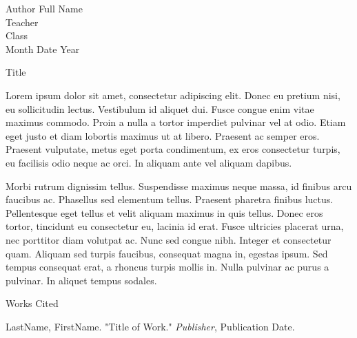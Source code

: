 \documentclass[12pt, letterpaper]{article}
\newcommand{\bibent}{\noindent \hangindent 40pt}
\newenvironment{workscited}{\newpage \begin{center} Works Cited \end{center}}{\newpage }
\begin{document}
\begin{flushleft}

Author Full Name\\
Teacher\\
Class\\
Month Date Year\\

\begin{center}
Title
\end{center}

\setlength{\parindent}{0.5in}

Lorem ipsum dolor sit amet, consectetur adipiscing elit. Donec eu pretium nisi, eu sollicitudin lectus. Vestibulum id aliquet dui. Fusce congue enim vitae maximus commodo. Proin a nulla a tortor imperdiet pulvinar vel at odio. Etiam eget justo et diam lobortis maximus ut at libero. Praesent ac semper eros. Praesent vulputate, metus eget porta condimentum, ex eros consectetur turpis, eu facilisis odio neque ac orci. In aliquam ante vel aliquam dapibus.

Morbi rutrum dignissim tellus. Suspendisse maximus neque massa, id finibus arcu faucibus ac. Phasellus sed elementum tellus. Praesent pharetra finibus luctus. Pellentesque eget tellus et velit aliquam maximus in quis tellus. Donec eros tortor, tincidunt eu consectetur eu, lacinia id erat. Fusce ultricies placerat urna, nec porttitor diam volutpat ac. Nunc sed congue nibh. Integer et consectetur quam. Aliquam sed turpis faucibus, consequat magna in, egestas ipsum. Sed tempus consequat erat, a rhoncus turpis mollis in. Nulla pulvinar ac purus a pulvinar. In aliquet tempus sodales.


\begin{workscited}

\bibent
LastName, FirstName. "Title of Work." \textit{Publisher}, Publication Date.

\end{workscited}

\end{flushleft}
\end{document}
